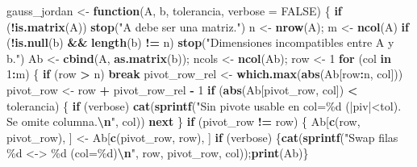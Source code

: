 \documentclass[
]{book}
\newenvironment{Shaded}{\begin{snugshade}}{\end{snugshade}}
\newcommand{\AttributeTok}[1]{\textcolor[rgb]{0.13,0.29,0.53}{#1}}
\newcommand{\ConstantTok}[1]{\textcolor[rgb]{0.56,0.35,0.01}{#1}}
\newcommand{\ControlFlowTok}[1]{\textcolor[rgb]{0.13,0.29,0.53}{\textbf{#1}}}
\newcommand{\DecValTok}[1]{\textcolor[rgb]{0.00,0.00,0.81}{#1}}
\newcommand{\FunctionTok}[1]{\textcolor[rgb]{0.13,0.29,0.53}{\textbf{#1}}}
\newcommand{\NormalTok}[1]{#1}
\newcommand{\OtherTok}[1]{\textcolor[rgb]{0.56,0.35,0.01}{#1}}
\newcommand{\SpecialCharTok}[1]{\textcolor[rgb]{0.81,0.36,0.00}{\textbf{#1}}}
\newcommand{\StringTok}[1]{\textcolor[rgb]{0.31,0.60,0.02}{#1}}
\begin{document}
\begin{Shaded}
\begin{Highlighting}[]
\NormalTok{gauss\_jordan }\OtherTok{\textless{}{-}} \ControlFlowTok{function}\NormalTok{(A, b, tolerancia, }\AttributeTok{verbose =} \ConstantTok{FALSE}\NormalTok{) \{}
  \ControlFlowTok{if}\NormalTok{ (}\SpecialCharTok{!}\FunctionTok{is.matrix}\NormalTok{(A)) }\FunctionTok{stop}\NormalTok{(}\StringTok{"A debe ser una matriz."}\NormalTok{)}
\NormalTok{  n }\OtherTok{\textless{}{-}} \FunctionTok{nrow}\NormalTok{(A); m }\OtherTok{\textless{}{-}} \FunctionTok{ncol}\NormalTok{(A)}
  \ControlFlowTok{if}\NormalTok{ (}\SpecialCharTok{!}\FunctionTok{is.null}\NormalTok{(b) }\SpecialCharTok{\&\&} \FunctionTok{length}\NormalTok{(b) }\SpecialCharTok{!=}\NormalTok{ n) }\FunctionTok{stop}\NormalTok{(}\StringTok{"Dimensiones incompatibles entre A y b."}\NormalTok{)}
\NormalTok{  Ab }\OtherTok{\textless{}{-}} \FunctionTok{cbind}\NormalTok{(A, }\FunctionTok{as.matrix}\NormalTok{(b));  ncols }\OtherTok{\textless{}{-}} \FunctionTok{ncol}\NormalTok{(Ab); row }\OtherTok{\textless{}{-}} \DecValTok{1}
  \ControlFlowTok{for}\NormalTok{ (col }\ControlFlowTok{in} \DecValTok{1}\SpecialCharTok{:}\NormalTok{m) \{}
    \ControlFlowTok{if}\NormalTok{ (row }\SpecialCharTok{\textgreater{}}\NormalTok{ n) }\ControlFlowTok{break}
\NormalTok{    pivot\_row\_rel }\OtherTok{\textless{}{-}} \FunctionTok{which.max}\NormalTok{(}\FunctionTok{abs}\NormalTok{(Ab[row}\SpecialCharTok{:}\NormalTok{n, col]))}
\NormalTok{    pivot\_row }\OtherTok{\textless{}{-}}\NormalTok{ row }\SpecialCharTok{+}\NormalTok{ pivot\_row\_rel }\SpecialCharTok{{-}} \DecValTok{1}
    \ControlFlowTok{if}\NormalTok{ (}\FunctionTok{abs}\NormalTok{(Ab[pivot\_row, col]) }\SpecialCharTok{\textless{}}\NormalTok{ tolerancia) \{}
      \ControlFlowTok{if}\NormalTok{ (verbose) }\FunctionTok{cat}\NormalTok{(}\FunctionTok{sprintf}\NormalTok{(}\StringTok{"Sin pivote usable en col=\%d (|piv|\textless{}tol). Se omite columna.}\SpecialCharTok{\textbackslash{}n}\StringTok{"}\NormalTok{, col))}
      \ControlFlowTok{next}
\NormalTok{    \}}
    \ControlFlowTok{if}\NormalTok{ (pivot\_row }\SpecialCharTok{!=}\NormalTok{ row) \{}
\NormalTok{      Ab[}\FunctionTok{c}\NormalTok{(row, pivot\_row), ] }\OtherTok{\textless{}{-}}\NormalTok{ Ab[}\FunctionTok{c}\NormalTok{(pivot\_row, row), ]}
      \ControlFlowTok{if}\NormalTok{ (verbose) \{}\FunctionTok{cat}\NormalTok{(}\FunctionTok{sprintf}\NormalTok{(}\StringTok{"Swap filas \%d \textless{}{-}\textgreater{} \%d (col=\%d)}\SpecialCharTok{\textbackslash{}n}\StringTok{"}\NormalTok{, row, pivot\_row, col));}\FunctionTok{print}\NormalTok{(Ab)\}}

\end{Highlighting}
\end{Shaded}
\end{document}

